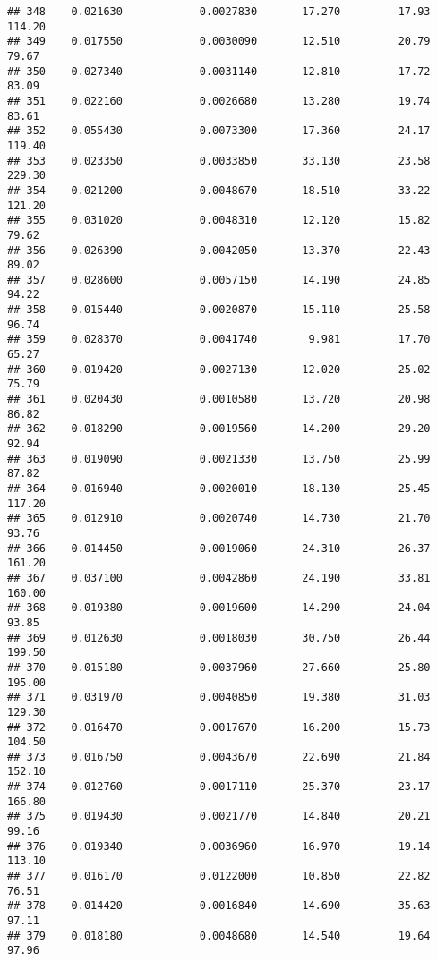\documentclass[
]{article}
\begin{document}
\begin{verbatim}
## 348    0.021630            0.0027830       17.270         17.93          114.20
## 349    0.017550            0.0030090       12.510         20.79           79.67
## 350    0.027340            0.0031140       12.810         17.72           83.09
## 351    0.022160            0.0026680       13.280         19.74           83.61
## 352    0.055430            0.0073300       17.360         24.17          119.40
## 353    0.023350            0.0033850       33.130         23.58          229.30
## 354    0.021200            0.0048670       18.510         33.22          121.20
## 355    0.031020            0.0048310       12.120         15.82           79.62
## 356    0.026390            0.0042050       13.370         22.43           89.02
## 357    0.028600            0.0057150       14.190         24.85           94.22
## 358    0.015440            0.0020870       15.110         25.58           96.74
## 359    0.028370            0.0041740        9.981         17.70           65.27
## 360    0.019420            0.0027130       12.020         25.02           75.79
## 361    0.020430            0.0010580       13.720         20.98           86.82
## 362    0.018290            0.0019560       14.200         29.20           92.94
## 363    0.019090            0.0021330       13.750         25.99           87.82
## 364    0.016940            0.0020010       18.130         25.45          117.20
## 365    0.012910            0.0020740       14.730         21.70           93.76
## 366    0.014450            0.0019060       24.310         26.37          161.20
## 367    0.037100            0.0042860       24.190         33.81          160.00
## 368    0.019380            0.0019600       14.290         24.04           93.85
## 369    0.012630            0.0018030       30.750         26.44          199.50
## 370    0.015180            0.0037960       27.660         25.80          195.00
## 371    0.031970            0.0040850       19.380         31.03          129.30
## 372    0.016470            0.0017670       16.200         15.73          104.50
## 373    0.016750            0.0043670       22.690         21.84          152.10
## 374    0.012760            0.0017110       25.370         23.17          166.80
## 375    0.019430            0.0021770       14.840         20.21           99.16
## 376    0.019340            0.0036960       16.970         19.14          113.10
## 377    0.016170            0.0122000       10.850         22.82           76.51
## 378    0.014420            0.0016840       14.690         35.63           97.11
## 379    0.018180            0.0048680       14.540         19.64           97.96

\end{verbatim}
\end{document}
